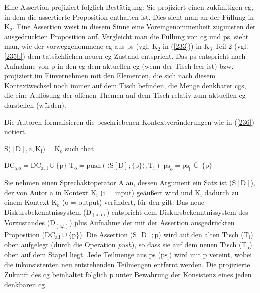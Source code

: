 Eine Assertion projiziert folglich Bestätigung: Sie projiziert einen zukünftigen cg, in dem die assertierte Proposition enthalten ist. Dies sieht man an der Füllung in $\textrm{K}_{2}$. Eine Assertion weist in diesem Sinne eine Voreingenommenheit zugunsten der ausgedrückten Proposition auf. Vergleicht man die Füllung von cg und ps, sieht man, wie der vorweggenommene cg aus ps (vgl. $\textrm{K}_{2}$ in (\ref{233})) in $\textrm{K}_{3}$ Teil 2 (vgl. \ref{235b}) dem tatsächlichen neuen cg-Zustand entspricht. Das ps entspricht nach Aufnahme von p in den cg dem aktuellen cg (wenn der Tisch leer ist) bzw. projiziert im Einvernehmen mit den Elementen, die sich nach diesem Kontext\-wechsel noch immer auf dem Tisch befinden, die Menge denkbarer cgs, die eine Auflösung der offenen Themen auf dem Tisch relativ zum aktuellen cg darstellen (würden).

Die Autoren formalisieren die beschriebenen Kontextveränderungen wie in (\ref{236}) notiert. 

\begin{exe}
	\ex\label{236} 
		S($[\textrm{D}], \textrm{a}, \textrm{K}_{\textrm{i}}) = \textrm{K}_{\textrm{o}}$ such that
		\begin{xlist}	
			\ex\label{236a} $\textrm{DC}_{\textrm{a,o}} = \textrm{DC}_{\textrm{a, i}} \cup \lbrace\textrm{p}\rbrace$
			\ex\label{236b} $\textrm{T}_{\textrm{o}} = \textrm{push}(\langle \textrm{S}[\textrm{D}]; \lbrace \textrm{p} \rbrace \rangle, \textrm{T}						_{\textrm{i}})$
			\ex\label{236c} $\textrm{ps}_{\textrm{o}} = \textrm{ps}_{\textrm{i}} \ \overline\cup \ \lbrace \textrm{p} \rbrace$
			\hfill\hbox {\citet[92]{Farkas2010}}
		\end{xlist}
\end{exe}
Sie nehmen einen Sprechaktoperator A an, dessen Argument ein Satz ist ($\textrm{S}[\textrm{D}]$), der von Autor a in Kontext $\textrm{K}_{\textrm{i}}$ (i = input) geäußert wird und $\textrm{K}_{\textrm{i}}$ dadurch zu einem Kontext $\textrm{K}_{\textrm{o}}$ (o = output) verändert, für den gilt: Das neue Diskursbekenntnissystem ($\textrm{D}_{(\textrm{a,o})}$) entspricht dem Diskursbekenntnissystem des Vorzustandes ($\textrm{D}_{(\textrm{a,i})}$) plus Aufnahme der mit der Assertion ausgedrückten Proposition ($\textrm{DC}_{\textrm{a,i}} \cup \lbrace \textrm{p} \rbrace$). Die Assertion ($\textrm{S}[\textrm{D}]; \textrm{p}$) wird auf den alten Tisch ($\textrm{T}_{\textrm{i}}$) oben aufgelegt (durch die Operation \textit{push}), so dass sie auf dem neuen Tisch ($\textrm{T}_{\textrm{o}}$) oben auf dem Stapel liegt. Jede Teilmenge aus ps ($\textrm{ps}_{\textrm{i}}$) wird mit p vereint, wobei die inkonsistenten neu entstehenden Teilmengen entfernt werden. Die projizierte Zukunft des cg beinhaltet folglich p unter Bewahrung der Konsistenz eines jeden denkbaren cg.\\

